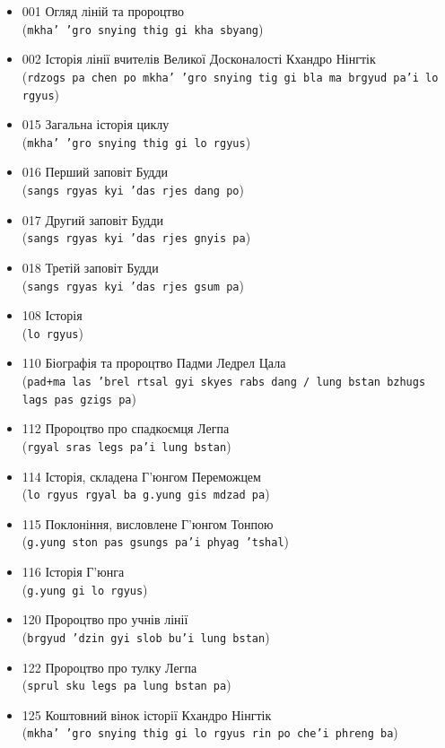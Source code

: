 \documentclass{article}
\begin{document}
\begingroup\raggedright
\begin{itemize}
\item 001 Огляд ліній та пророцтво \\ (\texttt{mkha' 'gro snying thig gi kha sbyang})
\item 002 Історія лінії вчителів Великої Досконалості Кхандро Нінгтік \\ (\texttt{rdzogs pa chen po mkha' 'gro snying tig gi bla ma brgyud pa'i lo rgyus})
\item 015 Загальна історія циклу \\ (\texttt{mkha' 'gro snying thig gi lo rgyus})
\item 016 Перший заповіт Будди \\ (\texttt{sangs rgyas kyi 'das rjes dang po})
\item 017 Другий заповіт Будди \\ (\texttt{sangs rgyas kyi 'das rjes gnyis pa})
\item 018 Третій заповіт Будди \\ (\texttt{sangs rgyas kyi 'das rjes gsum pa})
\item 108 Історія \\ (\texttt{lo rgyus})
\item 110 Біографія та пророцтво Падми Ледрел Цала \\ (\texttt{pad+ma las 'brel rtsal gyi skyes rabs dang / lung bstan bzhugs lags pas gzigs pa})
\item 112 Пророцтво про спадкоємця Легпа \\ (\texttt{rgyal sras legs pa'i lung bstan})
\item 114 Історія, складена Г’юнгом Переможцем \\ (\texttt{lo rgyus rgyal ba g.yung gis mdzad pa})
\item 115 Поклоніння, висловлене Г’юнгом Тонпою \\ (\texttt{g.yung ston pas gsungs pa'i phyag 'tshal})
\item 116 Історія Г’юнга \\ (\texttt{g.yung gi lo rgyus})
\item 120 Пророцтво про учнів лінії \\ (\texttt{brgyud 'dzin gyi slob bu'i lung bstan})
\item 122 Пророцтво про тулку Легпа \\ (\texttt{sprul sku legs pa lung bstan pa})
\item 125 Коштовний вінок історії Кхандро Нінгтік \\ (\texttt{mkha' 'gro snying thig gi lo rgyus rin po che'i phreng ba})
\end{itemize}
\endgroup
\end{document}
